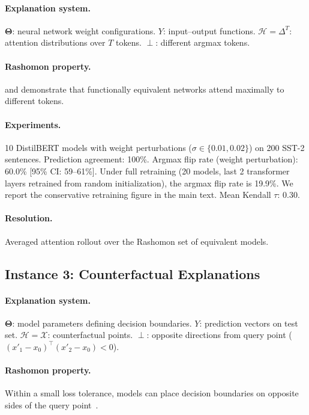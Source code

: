 \documentclass[11pt]{article}
\newcommand{\Params}{\mathbf{\Theta}}
\newcommand{\sH}{\mathcal{H}}
\newcommand{\incomp}{\perp}
\begin{document}
\paragraph{Explanation system.}
$\Params$: neural network weight configurations.
$Y$: input--output functions.
$\sH = \Delta^T$: attention distributions over $T$ tokens.
$\incomp$: different argmax tokens.

\paragraph{Rashomon property.}
\citet{damour2022underspecification} and \citet{jainwallace2019}
demonstrate that functionally equivalent networks attend maximally to
different tokens.

\paragraph{Experiments.}
10 DistilBERT models with weight perturbations ($\sigma \in \{0.01, 0.02\}$)
on 200 SST-2 sentences. Prediction agreement: 100\%. Argmax flip rate
(weight perturbation): 60.0\% [95\% CI: 59--61\%]. Under full retraining
(20 models, last 2 transformer layers retrained from random
initialization), the argmax flip rate is 19.9\%. We report the
conservative retraining figure in the main text.
Mean Kendall $\tau$: 0.30.

\paragraph{Resolution.}
Averaged attention rollout over the Rashomon set of equivalent models.

\subsection{Instance 3: Counterfactual Explanations}

\paragraph{Explanation system.}
$\Params$: model parameters defining decision boundaries.
$Y$: prediction vectors on test set.
$\sH = \mathcal{X}$: counterfactual points.
$\incomp$: opposite directions from query point
($(x'_1 - x_0)^\top(x'_2 - x_0) < 0$).

\paragraph{Rashomon property.}
Within a small loss tolerance, models can place decision boundaries on
opposite sides of the query point~\cite{semenova2022existence}.
\end{document}
